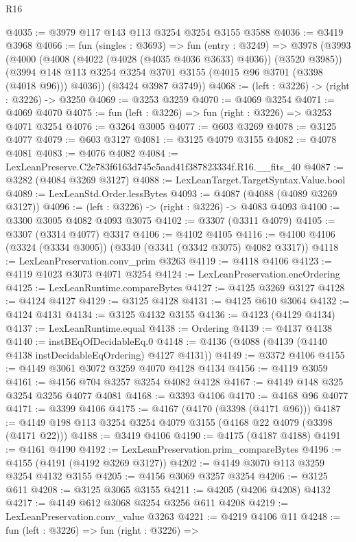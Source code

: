 \begin{lexlean}{R16}
\begin{coremodule}
@4035 := @3979 @117 @143 @113 @3254 @3254 @3155 @3588
@4036 := @3419 @3968
@4066 := fun (singles : @3693) =>
  fun (entry : @3249) =>
  @3978
    (@3993
      (@4000
        (@4008 (@4022 (@4028 (@4035 @4036 @3633) @4036)) (@3520 @3985))
        (@3994 @148 @113 @3254 @3254 @3701 @3155 (@4015 @96 @3701 (@3398 (@4018 @96))) @4036))
      (@3424 @3987 @3749))
@4068 := (left : @3226) -> (right : @3226) -> @3250
@4069 := @3253 @3259
@4070 := @4069 @3254
@4071 := @4069 @4070
@4075 := fun (left : @3226) => fun (right : @3226) => @3253 @4071 @3254
@4076 := @3264 @3005
@4077 := @603 @3269
@4078 := @3125 @4077
@4079 := @603 @3127
@4081 := @3125 @4079 @3155
@4082 := @4078 @4081
@4083 := @4076 @4082
@4084 := LexLeanPreserve.C2e783f6163d745c5aad41f387823334f.R16.__fits_40
@4087 := @3282 (@4084 @3269 @3127)
@4088 := LexLeanTarget.TargetSyntax.Value.bool
@4089 := LexLeanStd.Order.lessBytes
@4093 := @4087 (@4088 (@4089 @3269 @3127))
@4096 := (left : @3226) -> (right : @3226) -> @4083 @4093
@4100 := @3300 @3005 @4082 @4093 @3075
@4102 := @3307 (@3311 @4079)
@4105 := @3307 (@3314 @4077) @3317
@4106 := @4102 @4105
@4116 := @4100 @4106 (@3324 (@3334 @3005)) (@3340 (@3341 (@3342 @3075) @4082 @3317))
@4118 := LexLeanPreservation.conv_prim @3263
@4119 := @4118 @4106
@4123 := @4119 @1023 @3073 @4071 @3254
@4124 := LexLeanPreservation.encOrdering
@4125 := LexLeanRuntime.compareBytes
@4127 := @4125 @3269 @3127
@4128 := @4124 @4127
@4129 := @3125 @4128
@4131 := @4125 @610 @3064
@4132 := @4124 @4131
@4134 := @3125 @4132 @3155
@4136 := @4123 (@4129 @4134)
@4137 := LexLeanRuntime.equal
@4138 := Ordering
@4139 := @4137 @4138
@4140 := instBEqOfDecidableEq.{0}
@4148 := @4136 (@4088 (@4139 (@4140 @4138 instDecidableEqOrdering) @4127 @4131))
@4149 := @3372 @4106
@4155 := @4149 @3061 @3072 @3259 @4070 @4128 @4134
@4156 := @4119 @3059
@4161 := @4156 @704 @3257 @3254 @4082 @4128
@4167 := @4149 @148 @325 @3254 @3256 @4077 @4081
@4168 := @3393 @4106
@4170 := @4168 @96 @4077
@4171 := @3399 @4106
@4175 := @4167 (@4170 (@3398 (@4171 @96)))
@4187 := @4149 @198 @113 @3254 @3254 @4079 @3155 (@4168 @22 @4079 (@3398 (@4171 @22)))
@4188 := @3419 @4106
@4190 := @4175 (@4187 @4188)
@4191 := @4161 @4190
@4192 := LexLeanPreservation.prim_compareBytes
@4196 := @4155 (@4191 (@4192 @3269 @3127))
@4202 := @4149 @3070 @113 @3259 @3254 @4132 @3155
@4205 := @4156 @3069 @3257 @3254
@4206 := @3125 @611
@4208 := @3125 @3065 @3155
@4211 := @4205 (@4206 @4208) @4132
@4217 := @4149 @612 @3068 @3254 @3256 @611 @4208
@4219 := LexLeanPreservation.conv_value @3263
@4221 := @4219 @4106 @11
@4248 := fun (left : @3226) =>
  fun (right : @3226) =>

\end{coremodule}
\end{lexlean}
